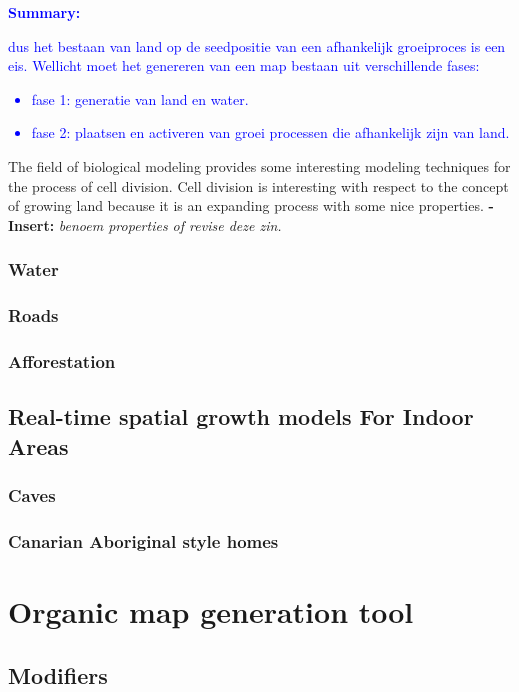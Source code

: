 \documentclass{article}
\newcommand{\inhoud}[1]{\textcolor{blue}{\textbf{\newline Summary: }\it{#1}}}
\newcommand{\voegtoe}[1]{\textcolor{MyDarkGreen}{\textbf{-Insert: }\it{#1}}}
\begin{document}
\inhoud
{dus het bestaan van land op de seedpositie van een afhankelijk groeiproces is een eis. Wellicht moet het genereren van een map bestaan uit verschillende fases:
\begin{itemize}
\item fase 1: generatie van land en water. 
\item fase 2: plaatsen en activeren van groei processen die afhankelijk zijn van land.  
\end{itemize}
}

The field of biological modeling provides some interesting modeling techniques for the process of cell division. 
Cell division is interesting with respect to the concept of growing land because it is an expanding process with some nice properties. \voegtoe{benoem properties of revise deze zin.} 


\subsubsection{Water} 

\subsubsection{Roads}

\subsubsection{Afforestation} 

\subsection{Real-time spatial growth models For Indoor Areas}

\subsubsection{Caves}

\subsubsection{Canarian Aboriginal style homes}

\section{Organic map generation tool}

\subsection{Modifiers}
\end{document}
